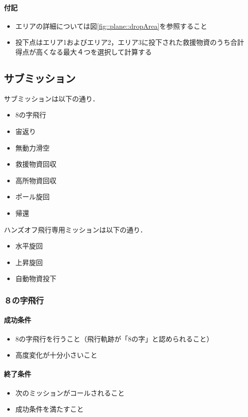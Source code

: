 \paragraph{付記}
\begin{itemize}
\item エリアの詳細については図\ref{fig::plane::dropArea}を参照すること
\item 投下点はエリア1およびエリア2，エリア3に投下された救援物資のうち合計得点が高くなる最大４つを選択して計算する
\end{itemize}

\subsection{サブミッション}
サブミッションは以下の通り．
\begin{itemize}
\item 8の字飛行
\item 宙返り
\item 無動力滑空
\item 救援物資回収
\item 高所物資回収
\item ポール旋回
\item 帰還
\end{itemize}

ハンズオフ飛行専用ミッションは以下の通り．
\begin{itemize}
\item 水平旋回
\item 上昇旋回
\item 自動物資投下
\end{itemize}

\subsubsection{８の字飛行}
\paragraph{成功条件}
\begin{itemize}
\item 8の字飛行を行うこと（飛行軌跡が「8の字」と認められること）
\item 高度変化が十分小さいこと
\end{itemize}
\paragraph{終了条件}
\begin{itemize}
\item 次のミッションがコールされること
\item 成功条件を満たすこと
\end{itemize}
